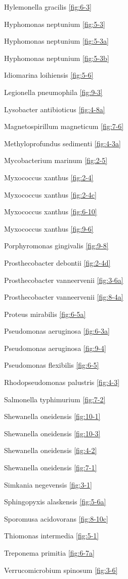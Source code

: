 \documentclass[]{tufte-book}
\begin{document}
Hylemonella gracilis \ref{fig:6-3}

Hyphomonas neptunium \ref{fig:5-3}

Hyphomonas neptunium \ref{fig:5-3a}

Hyphomonas neptunium \ref{fig:5-3b}

Idiomarina loihiensis \ref{fig:5-6}

Legionella pneumophila \ref{fig:9-3}

Lysobacter antibioticus \ref{fig:4-8a}

Magnetospirillum magneticum \ref{fig:7-6}

Methyloprofundus sedimenti \ref{fig:4-3a}

Mycobacterium marinum \ref{fig:2-5}

Myxococcus xanthus \ref{fig:2-4}

Myxococcus xanthus \ref{fig:2-4c}

Myxococcus xanthus \ref{fig:6-10}

Myxococcus xanthus \ref{fig:9-6}

Porphyromonas gingivalis \ref{fig:9-8}

Prosthecobacter debontii \ref{fig:2-4d}

Prosthecobacter vanneervenii \ref{fig:3-6a}

Prosthecobacter vanneervenii \ref{fig:8-4a}

Proteus mirabilis \ref{fig:6-5a}

Pseudomonas aeruginosa \ref{fig:6-3a}

Pseudomonas aeruginosa \ref{fig:9-4}

Pseudomonas flexibilis \ref{fig:6-5}

Rhodopseudomonas palustris \ref{fig:4-3}

Salmonella typhimurium \ref{fig:7-2}

Shewanella oneidensis \ref{fig:10-1}

Shewanella oneidensis \ref{fig:10-3}

Shewanella oneidensis \ref{fig:4-2}

Shewanella oneidensis \ref{fig:7-1}

Simkania negevensis \ref{fig:3-1}

Sphingopyxis alaskensis \ref{fig:5-6a}

Sporomusa acidovorans \ref{fig:8-10c}

Thiomonas intermedia \ref{fig:5-1}

Treponema primitia \ref{fig:6-7a}

Verrucomicrobium spinosum \ref{fig:3-6}
\end{document}
